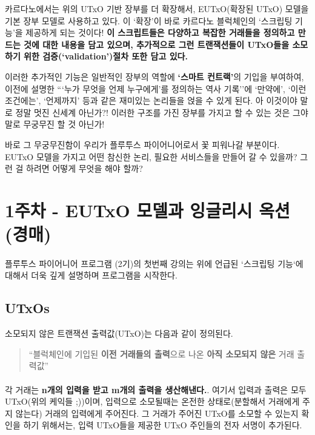 \documentclass[a4paper, 11pt]{article}
\begin{document}
\begin{description}
        카르다노에서는 위의 UTxO 기반 장부를 더 확장해서, EUTxO(확장된 UTxO) 모델을 기본 장부 모델로 사용하고 있다. 이 `확장'이 바로 카르다노 블럭체인의 `스크립팅 기능'을 제공하게 되는 것이다! \textbf{이 스크립트들은 다양하고 복잡한 거래들을 정의하고 만드는 것에 대한 내용을 담고 있으며, 추가적으로 그런 트랜잭션들이 UTxO들을  소모하기 위한 검증(`validation')절차 또한 담고 있다.}

        이러한 추가적인 기능은 일반적인 장부의 역할에 \textbf{`스마트 컨트랙'}의 기입을 부여하여, 이전에 설명한 ```누가 무엇을 언제 누구에게'를 정의하는 역사 기록''에 `만약에', `이런 조건에는', `언제까지' 등과 같은 재미있는 논리들을 얹을 수 있게 된다. 아 이것이야 말로 정말 멋진 신세계 아닌가?! 이러한 구조를 가진 장부를 가지고 할 수 있는 것은 그야말로 무궁무진 할 것 아닌가! 

        바로 그 무궁무진함이 우리가 플루투스 파이어니어로서 꽃 피워나갈 부분이다. EUTxO 모델을 가지고 어떤 참신한 논리, 필요한 서비스들을 만들어 갈 수 있을까? 그런 걸 하려면 어떻게 무엇을 해야 할까? 
    \end{description}
    
    \section{1주차 - EUTxO 모델과 잉글리시 옥션(경매)}

    \paragraph{} 플루투스 파이어니어 프로그램 (2기)의 첫번째 강의는 위에 언급된 `스크립팅 기능`에 대해서 더욱 깊게 설명하며 프로그램을 시작한다.

    \subsection{UTxOs}

    소모되지 않은 트랜잭션 출력값(UTxO)는 다음과 같이 정의된다.
    \begin{quotation}
        ``블럭체인에 기입된 \textbf{이전 거래들의 출력}으로 나온 \textbf{아직 소모되지 않은} 거래 출력값''
    \end{quotation}
    
    \paragraph{} 각 거래는 \textbf{n개의 입력을 받고 m개의 출력을 생산해낸다.}. 여기서 입력과 출력은 모두 UTxO(위의 케익들 ;))이며, 입력으로 소모될때는 온전한 상태로(분할해서 거래에게 주지 않는다) 거래의 입력에게 주어진다. 그 거래가 주어진 UTxO를 소모할 수 있는지 확인을 하기 위해서는, 입력 UTxO들을 제공한 UTxO 주인들의 전자 서명이 추가된다.
\end{document}
